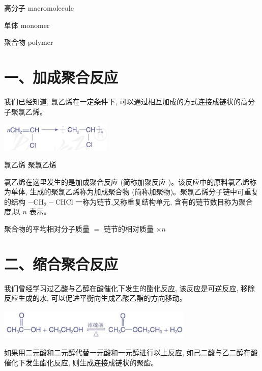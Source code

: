 \documentclass[10pt]{article}
\begin{document}
\begin{mdframed}

高分子 macromolecule

单体 monomer

聚合物 polymer

\end{mdframed}

\section*{一、加成聚合反应}

我们已经知道, 氯乙烯在一定条件下, 可以通过相互加成的方式连接成链状的高分子聚氯乙烯。

\begin{center}
\includegraphics[max width=0.4\textwidth]{images/0190efc5-b58a-7c43-bfb0-e0a030df9cfd_137_584608.jpg}
\end{center}

氯乙烯 聚氯乙烯

氯乙烯在这里发生的是加成聚合反应 (简称加聚反应 )。该反应中的原料氯乙烯称为单体, 生成的聚氯乙烯称为加成聚合物 (简称加聚物)。聚氯乙烯分子链中可重复的结构 \(- {\mathrm{{CH}}}_{2} - \mathrm{{CHCl}}\) 一称为链节,又称重复结构单元, 含有的链节数目称为聚合度,以 \(n\) 表示。

聚合物的平均相对分子质量 \(=\) 链节的相对质量 \(\times n\)

\section*{二、缩合聚合反应}

我们曾经学习过乙酸与乙醇在酸催化下发生的酯化反应, 该反应是可逆反应, 移除反应生成的水, 可以促进平衡向生成乙酸乙酯的方向移动。

\begin{center}
\includegraphics[max width=0.7\textwidth]{images/0190efc5-b58a-7c43-bfb0-e0a030df9cfd_138_476505.jpg}
\end{center}

如果用二元酸和二元醇代替一元酸和一元醇进行以上反应, 如己二酸与乙二醇在酸催化下发生酯化反应, 则生成连接成链状的聚酯。
\end{document}
